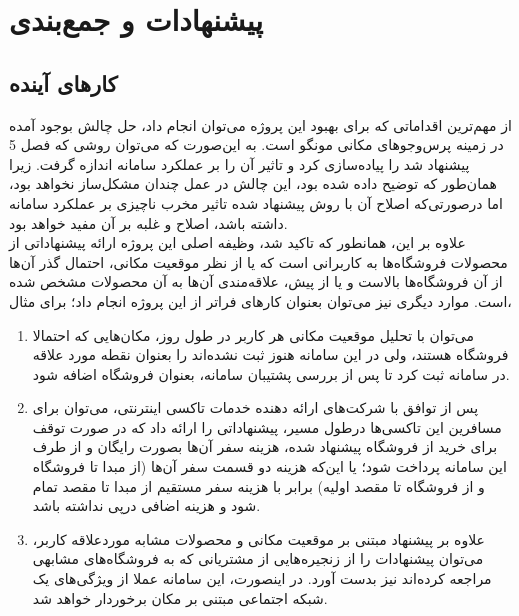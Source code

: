 \chapter{پیشنهادات و جمع‌بندی}

\section{کارهای آینده}

از مهم‌ترین اقداماتی که برای بهبود این پروژه می‌توان انجام داد، حل چالش بوجود آمده در زمینه پرس‌وجوهای مکانی مونگو است. به این‌صورت که می‌توان روشی که فصل 5 پیشنهاد شد را پیاده‌سازی کرد و تاثیر آن را بر عملکرد سامانه اندازه گرفت. زیرا همان‌طور که توضیح داده شده بود، این چالش در عمل چندان مشکل‌ساز نخواهد بود، اما درصورتی‌که اصلاح آن با روش پیشنهاد شده تاثیر مخرب ناچیزی بر عملکرد سامانه داشته باشد، اصلاح و غلبه بر آن مفید خواهد بود.\\

علاوه بر این، همانطور که تاکید شد، وظیفه اصلی این پروژه ارائه پیشنهاداتی از محصولات فروشگاه‌ها به کاربرانی است که یا از نظر موقعیت مکانی، احتمال گذر آن‌ها از آن فروشگاه‌ها بالاست و یا از پیش، علاقه‌مندی آن‌ها به آن محصولات مشخص شده است. موارد دیگری نیز می‌توان بعنوان کارهای فراتر از این پروژه انجام داد؛ برای مثال،

\begin{enumerate}

	\item می‌توان با تحلیل موقعیت مکانی هر کاربر در طول روز، مکان‌هایی که احتمالا فروشگاه هستند، ولی در این سامانه هنوز ثبت نشده‌اند را بعنوان نقطه مورد علاقه  در سامانه ثبت کرد تا پس از بررسی پشتیبان سامانه، بعنوان فروشگاه اضافه شود.
	\item پس از توافق با شرکت‌های ارائه دهنده خدمات تاکسی اینترنتی، می‌توان برای مسافرین این تاکسی‌ها درطول مسیر، پیشنهاداتی را ارائه داد که در صورت توقف برای خرید از فروشگاه پیشنهاد شده، هزینه سفر آن‌ها بصورت رایگان و از طرف این سامانه پرداخت شود؛ یا این‌که هزینه دو قسمت سفر آن‌ها (از مبدا تا فروشگاه و از فروشگاه تا مقصد اولیه) برابر با هزینه سفر مستقیم از مبدا تا مقصد تمام شود و هزینه اضافی درپی نداشته باشد.
	\item علاوه بر پیشنهاد مبتنی بر موقعیت مکانی و محصولات مشابه موردعلاقه کاربر، می‌توان پیشنهادات را از زنجیره‌هایی از مشتریانی که به فروشگاه‌های مشابهی مراجعه کرده‌اند نیز بدست آورد. در اینصورت، این سامانه عملا از ویژگی‌های یک شبکه اجتماعی مبتنی بر مکان برخوردار خواهد شد.
	
\end{enumerate}

